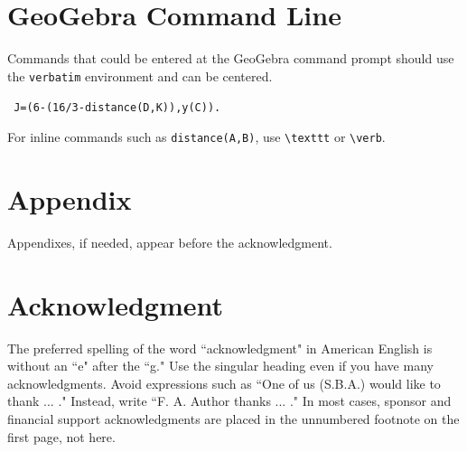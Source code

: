 \section{GeoGebra Command Line}
Commands that could be entered at the GeoGebra command prompt should use the \verb!verbatim! environment and can be centered.
\begin{center}
\verb! J=(6-(16/3-distance(D,K)),y(C)).!
\end{center}
For inline commands such as \texttt{distance(A,B)}, use \verb!\texttt! or \verb!\verb!.   


\section*{Appendix}
Appendixes, if needed, appear before the acknowledgment.



\section*{Acknowledgment}
The preferred spelling of the word ``acknowledgment" in American English is without an ``e" after the ``g." Use the singular heading even if you have many acknowledgments. Avoid expressions such as ``One of us (S.B.A.) would like to thank ... ." Instead, write ``F. A. Author thanks ... ." In most cases, sponsor and financial support acknowledgments are placed in the unnumbered footnote on the first page, not here.


